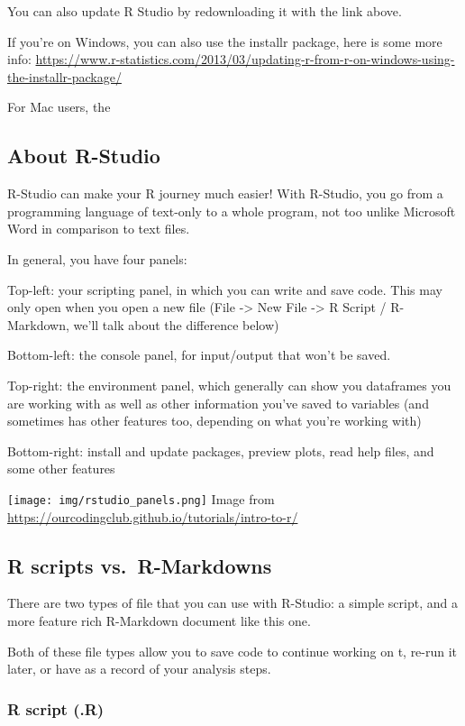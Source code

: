 \documentclass[
]{article}
\begin{document}
You can also update R Studio by redownloading it with the link above.

If you're on Windows, you can also use the installr package, here is
some more info:
\url{https://www.r-statistics.com/2013/03/updating-r-from-r-on-windows-using-the-installr-package/}

For Mac users, the

\hypertarget{about-r-studio}{%
\subsection{About R-Studio}\label{about-r-studio}}

R-Studio can make your R journey much easier! With R-Studio, you go from
a programming language of text-only to a whole program, not too unlike
Microsoft Word in comparison to text files.

In general, you have four panels:

Top-left: your scripting panel, in which you can write and save code.
This may only open when you open a new file (File -\textgreater{} New
File -\textgreater{} R Script / R-Markdown, we'll talk about the
difference below)

Bottom-left: the console panel, for input/output that won't be saved.

Top-right: the environment panel, which generally can show you
dataframes you are working with as well as other information you've
saved to variables (and sometimes has other features too, depending on
what you're working with)

Bottom-right: install and update packages, preview plots, read help
files, and some other features

\texttt{[image: img/rstudio\_panels.png]} Image from
\url{https://ourcodingclub.github.io/tutorials/intro-to-r/}

\hypertarget{r-scripts-vs.-r-markdowns}{%
\subsection{R scripts vs.~R-Markdowns}\label{r-scripts-vs.-r-markdowns}}

There are two types of file that you can use with R-Studio: a simple
script, and a more feature rich R-Markdown document like this one.

Both of these file types allow you to save code to continue working on
t, re-run it later, or have as a record of your analysis steps.

\hypertarget{r-script-.r}{%
\subsubsection{R script (.R)}\label{r-script-.r}}
\end{document}
